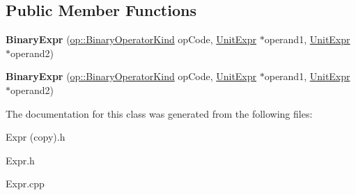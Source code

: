 \subsection*{Public Member Functions}
\begin{DoxyCompactItemize}
\item 
\mbox{\label{classspan_1_1ir_1_1expr_1_1BinaryExpr_a5ed00467a423a3eb106d945cfcaae1cf}} 
{\bfseries Binary\+Expr} (\hyperlink{namespacespan_1_1ir_1_1op_a5741ac4595bea9e1d2821a8bb5d953e3}{op\+::\+Binary\+Operator\+Kind} op\+Code, \hyperlink{classspan_1_1ir_1_1expr_1_1UnitExpr}{Unit\+Expr} $\ast$operand1, \hyperlink{classspan_1_1ir_1_1expr_1_1UnitExpr}{Unit\+Expr} $\ast$operand2)
\item 
\mbox{\label{classspan_1_1ir_1_1expr_1_1BinaryExpr_ab3278e315a650404ba1414d390232b30}} 
{\bfseries Binary\+Expr} (\hyperlink{namespacespan_1_1ir_1_1op_a5741ac4595bea9e1d2821a8bb5d953e3}{op\+::\+Binary\+Operator\+Kind} op\+Code, \hyperlink{classspan_1_1ir_1_1expr_1_1UnitExpr}{Unit\+Expr} $\ast$operand1, \hyperlink{classspan_1_1ir_1_1expr_1_1UnitExpr}{Unit\+Expr} $\ast$operand2)
\end{DoxyCompactItemize}


The documentation for this class was generated from the following files\+:\begin{DoxyCompactItemize}
\item 
Expr (copy).\+h\item 
Expr.\+h\item 
Expr.\+cpp\end{DoxyCompactItemize}
